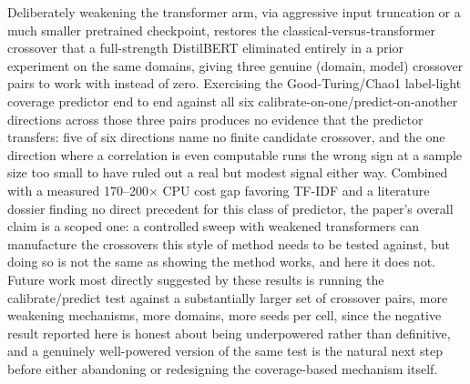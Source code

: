 \documentclass[11pt,letterpaper]{article}
\begin{document}
Deliberately weakening the transformer arm, via aggressive input truncation or a much smaller pretrained checkpoint, restores the classical-versus-transformer crossover that a full-strength DistilBERT eliminated entirely in a prior experiment on the same domains, giving three genuine (domain, model) crossover pairs to work with instead of zero. Exercising the Good-Turing/Chao1 label-light coverage predictor end to end against all six calibrate-on-one/predict-on-another directions across those three pairs produces no evidence that the predictor transfers: five of six directions name no finite candidate crossover, and the one direction where a correlation is even computable runs the wrong sign at a sample size too small to have ruled out a real but modest signal either way. Combined with a measured 170--200$\times$ CPU cost gap favoring TF-IDF and a literature dossier finding no direct precedent for this class of predictor, the paper's overall claim is a scoped one: a controlled sweep with weakened transformers can manufacture the crossovers this style of method needs to be tested against, but doing so is not the same as showing the method works, and here it does not. Future work most directly suggested by these results is running the calibrate/predict test against a substantially larger set of crossover pairs, more weakening mechanisms, more domains, more seeds per cell, since the negative result reported here is honest about being underpowered rather than definitive, and a genuinely well-powered version of the same test is the natural next step before either abandoning or redesigning the coverage-based mechanism itself.



\end{document}
